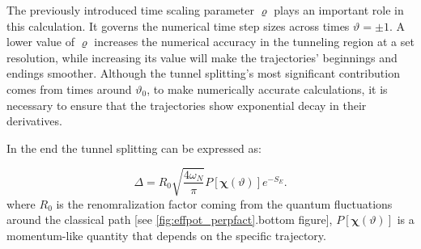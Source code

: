 \documentclass[prb,twocolumn,showpacs,preprintnumbers,amsmath,amssymb, superscriptaddress]{revtex4-2}
\newcommand{\n}{N}
\newcommand{\1}{{1\hspace*{-0.5ex} \textrm{l} \hspace*{0.5ex}}}
\begin{document}
The previously introduced time scaling parameter $\varrho$ plays an important role in this calculation. It governs the numerical time step sizes across times $\vartheta = \pm 1$. A lower value of $\varrho$ increases the numerical accuracy in the tunneling region at a set resolution, while increasing its value will make the trajectories' beginnings and endings smoother. Although the tunnel splitting's most significant contribution comes from times around $\vartheta_0$, to make numerically accurate calculations, it is necessary to ensure that the trajectories show exponential decay in their derivatives.

In the end the tunnel splitting can be expressed as:

\begin{equation}
\Delta = R_0 \sqrt{\frac{4\omega_\n}{\pi}} P\left[ \mathbold{\chi}(\vartheta) \right] e^{-S_E}.
\end{equation}
where $R_0$ is the renomralization factor coming from the quantum fluctuations around the classical path [see \ref{fig:effpot_perpfact}.bottom figure], $P\left[ \mathbold{\chi}(\vartheta) \right]$ is a momentum-like quantity that depends on the specific trajectory.
\end{document}
